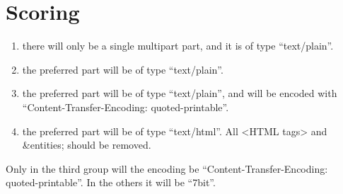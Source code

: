 \section*{Scoring}

\begin{enumerate}
	\item[20 points] there will only be a single multipart part, and it is of type ``text/plain''.
	\item[30 points] the preferred part will be of type ``text/plain''.
	\item[25 points] the preferred part will be of type ``text/plain'', and will be encoded with ``Content-Transfer-Encoding: quoted-printable''.
  \item[25 points] the preferred part will be of type ``text/html''. All <HTML tags> and \&entities; should be removed.
\end{enumerate}

Only in the third group will the encoding be ``Content-Transfer-Encoding: quoted-printable''. In the others it will be ``7bit''.

